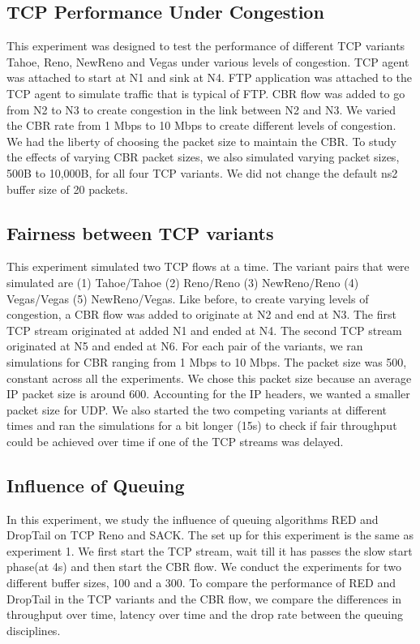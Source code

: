  \subsection{TCP Performance Under Congestion}
This experiment was designed to test the performance of different TCP variants Tahoe, Reno, NewReno and Vegas under various levels of congestion. TCP agent was attached to start at N1 and sink at N4. FTP application was attached to the TCP agent to simulate traffic that is typical of FTP. CBR flow was added to go from N2 to N3 to create congestion in the link between N2 and N3. We varied the CBR rate from 1 Mbps to 10 Mbps to create different levels of congestion. We had the liberty of choosing the packet size to maintain the CBR. To study the effects of varying CBR packet sizes, we also simulated varying packet sizes, 500B to 10,000B, for all four TCP variants. We did not change the default ns2 buffer size of 20 packets.  
 \subsection{Fairness between TCP variants}
This experiment simulated two TCP flows at a time. The variant pairs that were simulated are (1) Tahoe/Tahoe (2) Reno/Reno (3) NewReno/Reno (4) Vegas/Vegas (5) NewReno/Vegas. Like before, to create varying levels of congestion, a CBR flow was added to originate at N2 and end at N3. The first TCP stream originated at added N1 and ended at N4. The second TCP stream originated at N5 and ended at N6. For each pair of the variants, we ran simulations for CBR ranging from 1 Mbps to 10 Mbps. The packet size was 500, constant across all the experiments. We chose this packet size because an average IP packet size is around 600. Accounting for the IP headers, we wanted a smaller packet size for UDP. 
We also started the two competing variants at different times and ran the simulations for a bit longer (15s) to check if fair throughput could be achieved over time if one of the TCP streams was delayed.
 \subsection{Influence of Queuing}
In this experiment, we study the influence of queuing algorithms RED and DropTail on TCP Reno and SACK. The set up for this experiment is the same as experiment 1. We first start the TCP stream, wait till it has passes the slow start phase(at 4s) and then start the CBR flow. We conduct the experiments for two different buffer sizes, 100 and a 300. To compare the performance of RED and DropTail in the TCP variants and the CBR flow, we compare the differences in throughput over time, latency over time and the drop rate between the queuing disciplines. 
